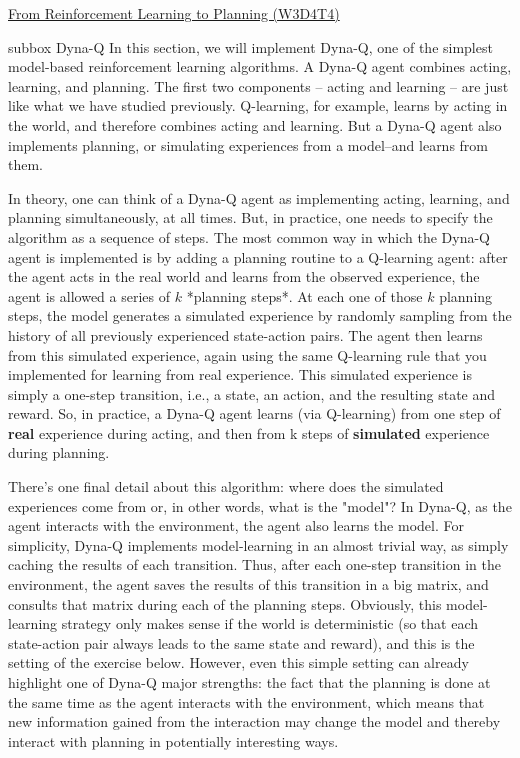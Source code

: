 \begin{textbox}{\href{https://compneuro.neuromatch.io/tutorials/W3D4_ReinforcementLearning/student/W3D4_Tutorial4.html}{From Reinforcement Learning to Planning (W3D4T4)} }

\begin{subbox}{subbox}{ Dyna-Q}
\scriptsize
In this section, we will implement Dyna-Q, one of the simplest model-based reinforcement learning algorithms. A Dyna-Q agent combines acting, learning, and planning. The first two components -- acting and learning -- are just like what we have studied previously. Q-learning, for example, learns by acting in the world, and therefore combines acting and learning. But a Dyna-Q agent also implements planning, or simulating experiences from a model--and learns from them. 

In theory, one can think of a Dyna-Q agent as implementing acting, learning, and planning simultaneously, at all times. But, in practice, one needs to specify the algorithm as a sequence of steps. The most common way in which the Dyna-Q agent is implemented is by adding a planning routine to a Q-learning agent: after the agent acts in the real world and learns from the observed experience, the agent is allowed a series of $k$ *planning steps*. At each one of those $k$ planning steps, the model generates a simulated experience by randomly sampling from the history of all previously experienced state-action pairs. The agent then learns from this simulated experience, again using the same Q-learning rule that you implemented for learning from real experience. This simulated experience is simply a one-step transition, i.e., a state, an action, and the resulting state and reward. So, in practice, a Dyna-Q agent learns (via Q-learning) from one step of \textbf{real} experience during acting, and then from k steps of \textbf{simulated} experience during planning.

There's one final detail about this algorithm: where does the simulated experiences come from or, in other words, what is the "model"? In Dyna-Q, as the agent interacts with the environment, the agent also learns the model. For simplicity, Dyna-Q implements model-learning in an almost trivial way, as simply caching the results of each transition. Thus, after each one-step transition in the environment, the agent saves the results of this transition in a big matrix, and consults that matrix during each of the planning steps. Obviously, this model-learning strategy only makes sense if the world is deterministic (so that each state-action pair always leads to the same state and reward), and this is the setting of the exercise below. However, even this simple setting can already highlight one of Dyna-Q major strengths: the fact that the planning is done at the same time as the agent interacts with the environment, which means that new information gained from the interaction may change the model and thereby interact with planning in potentially interesting ways.

\end{subbox}
\end{textbox}
